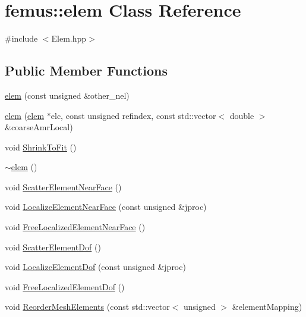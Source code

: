 \hypertarget{classfemus_1_1elem}{}\section{femus\+:\+:elem Class Reference}
\label{classfemus_1_1elem}


{\ttfamily \#include $<$Elem.\+hpp$>$}

\subsection*{Public Member Functions}
\begin{DoxyCompactItemize}
\item 
\mbox{\hyperlink{classfemus_1_1elem_af0d54d7c0c7a5c0a7d1f0586ff28fa41}{elem}} (const unsigned \&other\+\_\+nel)
\item 
\mbox{\hyperlink{classfemus_1_1elem_accb87238cdfe0417be67692c152f38bd}{elem}} (\mbox{\hyperlink{classfemus_1_1elem}{elem}} $\ast$elc, const unsigned refindex, const std\+::vector$<$ double $>$ \&coarse\+Amr\+Local)
\item 
void \mbox{\hyperlink{classfemus_1_1elem_afa830dc9dc77d5292d126bf0156f5330}{Shrink\+To\+Fit}} ()
\item 
\mbox{\hyperlink{classfemus_1_1elem_ae1e94fa2475ed9a86fa504592cd59b98}{$\sim$elem}} ()
\item 
void \mbox{\hyperlink{classfemus_1_1elem_a1fbaf0f106a278950775a386ef0a7f55}{Scatter\+Element\+Near\+Face}} ()
\item 
void \mbox{\hyperlink{classfemus_1_1elem_a14eab6e5b0eea4f2cd714ad79c78cd12}{Localize\+Element\+Near\+Face}} (const unsigned \&jproc)
\item 
void \mbox{\hyperlink{classfemus_1_1elem_a33d168031ff3a1368c6dbe5060177111}{Free\+Localized\+Element\+Near\+Face}} ()
\item 
void \mbox{\hyperlink{classfemus_1_1elem_af48747556a201848ae9a213cd472070a}{Scatter\+Element\+Dof}} ()
\item 
void \mbox{\hyperlink{classfemus_1_1elem_ade1815f54f3b5786c58fb9c54574e21a}{Localize\+Element\+Dof}} (const unsigned \&jproc)
\item 
void \mbox{\hyperlink{classfemus_1_1elem_a4e0777db21ee2ce5e53109f1dbf6a5b7}{Free\+Localized\+Element\+Dof}} ()
\item 
void \mbox{\hyperlink{classfemus_1_1elem_afdc6c215b3ce3424c50c8d8aa30ac660}{Reorder\+Mesh\+Elements}} (const std\+::vector$<$ unsigned $>$ \&element\+Mapping)
\item 

\end{DoxyCompactItemize}
